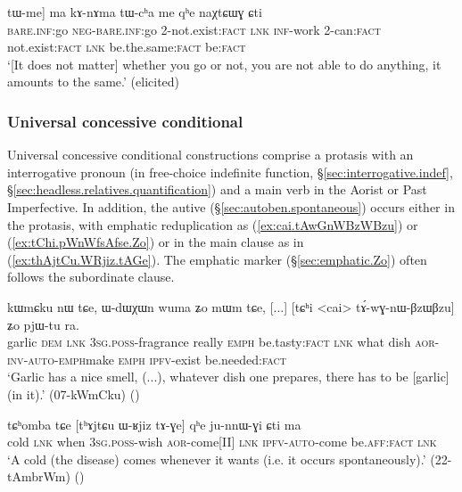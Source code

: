 \begin{exe}
\ex  \label{ex:Ce.mACe.tWme}
\gll [[ɕe] [mɤ-ɕe] tɯ-me] ma kɤ-nɤma tɯ-cʰa me qʰe naχtɕɯɣ ɕti\\
\textsc{bare}.\textsc{inf}:go \textsc{neg}-\textsc{bare}.\textsc{inf}:go 2-not.exist:\textsc{fact} \textsc{lnk} \textsc{inf}-work 2-can:\textsc{fact} not.exist:\textsc{fact} \textsc{lnk} be.the.same:\textsc{fact} be:\textsc{fact} \\
\glt `[It does not matter] whether you go or not, you are not able to do anything, it amounts to the same.' (elicited)
\end{exe}

\subsubsection{Universal concessive conditional} \label{sec:universal.concessive.conditional}
Universal concessive conditional constructions comprise a protasis with an interrogative pronoun (in free-choice indefinite function, §\ref{sec:interrogative.indef}, §\ref{sec:headless.relatives.quantification}) and a main verb in the Aorist or Past Imperfective. In addition, the autive (§\ref{sec:autoben.spontaneous}) occurs either in the protasis, with emphatic reduplication as (\ref{ex:cai.tAwGnWBzWBzu}) or (\ref{ex:tChi.pWnWfsAfse.Zo}) or in the main clause as in (\ref{ex:thAjtCu.WRjiz.tAGe}). The emphatic marker  (§\ref{sec:emphatic.Zo}) often follows the subordinate clause.


\begin{exe}
\ex \label{ex:cai.tAwGnWBzWBzu}
\gll kɯmɕku nɯ tɕe, ɯ-dɯχɯn wuma ʑo mɯm tɕe, [...]  [tɕʰi <cai> tɤ́-wɣ-nɯ-βzɯ\redp{}βzu] ʑo pjɯ-tu ra. \\
garlic \textsc{dem} \textsc{lnk} \textsc{3sg}.\textsc{poss}-fragrance really \textsc{emph} be.tasty:\textsc{fact} \textsc{lnk} { } what dish \textsc{aor}-\textsc{inv}-\textsc{auto}-\textsc{emph}\redp{}make \textsc{emph} \textsc{ipfv}-exist  be.needed:\textsc{fact} \\
\glt `Garlic has a nice smell, (...), whatever dish one prepares, there has to be [garlic] (in it).' (07-kWmCku)
()
\end{exe}

 \begin{exe}
\ex \label{ex:thAjtCu.WRjiz.tAGe}
\gll  tɕʰomba tɕe [tʰɤjtɕu ɯ-ʁjiz tɤ-ɣe] qʰe ju-nnɯ-ɣi ɕti ma \\
cold \textsc{lnk} when \textsc{3sg}.\textsc{poss}-wish \textsc{aor}-come[II] \textsc{lnk} \textsc{ipfv}-\textsc{auto}-come be.\textsc{aff}:\textsc{fact} \textsc{lnk} \\
\glt `A cold (the disease) comes whenever it wants (i.e. it occurs spontaneously).' (22-tAmbrWm)
()
\end{exe}


